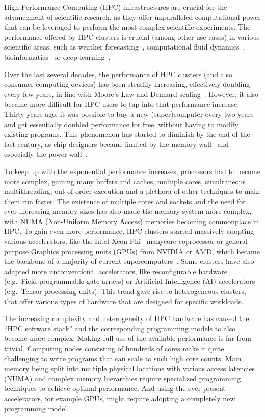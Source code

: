 High Performance Computing (HPC) infrastructures are crucial for the advancement of scientific
research, as they offer unparalleled computational power that can be leveraged to perform the most
complex scientific experiments. The performance offered by HPC clusters is crucial (among other
use-cases) in various scientific areas, such as weather forecasting~\cite{wrf},
computational fluid dynamics~\cite{cfd}, bioinformatics~\cite{bioinformatics} or deep
learning~\cite{hpcdl}.

Over the last several decades, the performance of HPC clusters (and also consumer computing
devices) has been steadily increasing, effectively doubling every few years, in line with Moore's
Law and Dennard scaling~\cite{mooreslaw}. However, it also became more difficult for HPC users
to tap into that performance increase. Thirty years ago, it was possible to buy a new
(super)computer every two years and get essentially doubled performance for free, without having to
modify existing programs. This phenomenon has started to diminish by the end of the last century,
as chip designers became limited by the memory wall~\cite{memorywall} and especially the power
wall~\cite{powerwall}.

To keep up with the exponential performance increases, processors had to become more complex,
gaining many buffers and caches, multiple cores, simultaneous multithreading, out-of-order
execution and a plethora of other techniques to make them run faster. The existence of multiple
cores and sockets and the need for ever-increasing memory sizes has also made the memory system
more complex, with NUMA (Non-Uniform Memory Access) memories becoming commonplace in HPC\@. To gain
even more performance, HPC clusters started massively adopting various accelerators, like the Intel
Xeon Phi~\cite{xeonphi} manycore coprocessor or general-purpose Graphics processing units
(GPUs) from NVIDIA or AMD, which became the backbone of a majority of current
supercomputers~\cite{top500gpu}. Some clusters have also adapted more unconventional
accelerators, like reconfigurable hardware (e.g.\ Field-programmable gate arrays) or Artificial
Intelligence (AI) accelerators (e.g.\ Tensor processing units). This trend gave rise to
heterogeneous clusters, that offer various types of hardware that are designed for specific
workloads.

The increasing complexity and heterogeneity of HPC hardware has caused the ``HPC software stack''
and the corresponding programming models to also become more complex. Making full use of the
available performance is far from trivial. Computing nodes consisting of hundreds of cores make it
quite challenging to write programs that can scale to such high core counts. Main memory being
split into multiple physical locations with various access latencies (NUMA) and complex memory
hierarchies require specialized programming techniques to achieve optimal performance. And using
the ever-present accelerators, for example GPUs, might require adopting a completely new
programming model.

